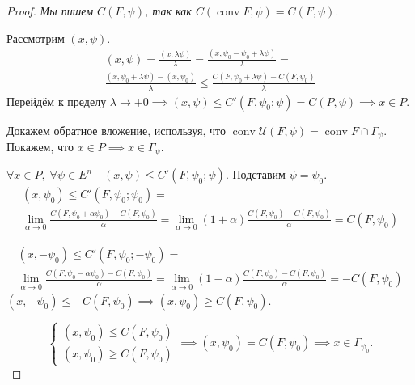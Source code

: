 \begin{proof}
    \textit{Мы пишем $C(F, \psi)$, так как $C(\operatorname{conv}F, \psi) = C(F, \psi)$}.
    
    Рассмотрим $(x, \psi)$.
    \begin{gather*}
        (x, \psi) = \frac{(x, \lambda \psi)}{\lambda} = 
        \frac{(x, \psi_0 - \psi_0 + \lambda \psi)}{\lambda} = \\
        \frac{(x, \psi_0 + \lambda \psi) - (x, \psi_0)}{\lambda} \leqslant 
        \frac{C(F, \psi_0 + \lambda \psi) - C(F, \psi_0)}{\lambda}
    \end{gather*}
    Перейдём к пределу $\lambda \to +0 \implies (x, \psi) \leqslant C'(F, \psi_0; \psi) = C(P, \psi) \implies x \in P$.

    \bigskip
    Докажем обратное вложение, используя, что $\operatorname{conv}\mathcal{U}(F, \psi) = \operatorname{conv}F \cap \Gamma_\psi$.
    Покажем, что $x \in P \implies x \in \Gamma_\psi$.

    $\forall x \in P, \; \forall \psi \in E^n \quad (x, \psi) \leqslant C'(F, \psi_0; \psi)$.
    Подставим $\psi = \psi_0$.
    \begin{gather*}
        (x, \psi_0) \leqslant C'(F, \psi_0; \psi_0) = \\
        \lim\limits_{\alpha \to 0} \frac{C(F, \psi_0 + \alpha \psi_0) - C(F, \psi_0)}{\alpha} = 
        \lim\limits_{\alpha \to 0} (1 + \alpha)\frac{C(F, \psi_0) - C(F, \psi_0)}{\alpha} = C(F, \psi_0)
    \end{gather*}

    \begin{gather*}
        (x, -\psi_0) \leqslant C'(F, \psi_0; -\psi_0) = \\
        \lim\limits_{\alpha \to 0} \frac{C(F, \psi_0 - \alpha \psi_0) - C(F, \psi_0)}{\alpha} = 
        \lim\limits_{\alpha \to 0} (1 - \alpha)\frac{C(F, \psi_0) - C(F, \psi_0)}{\alpha} = -C(F, \psi_0)
    \end{gather*}
    $(x, -\psi_0) \leqslant -C(F, \psi_0) \implies (x, \psi_0) \geqslant C(F, \psi_0) $.

    \begin{equation*}
        \begin{cases}
            (x, \psi_0) \leqslant C(F, \psi_0) \\
            (x, \psi_0) \geqslant C(F, \psi_0)
        \end{cases} \implies (x, \psi_0) = C(F, \psi_0) \implies x \in \Gamma_{\psi_0}.
    \end{equation*}


\end{proof}
